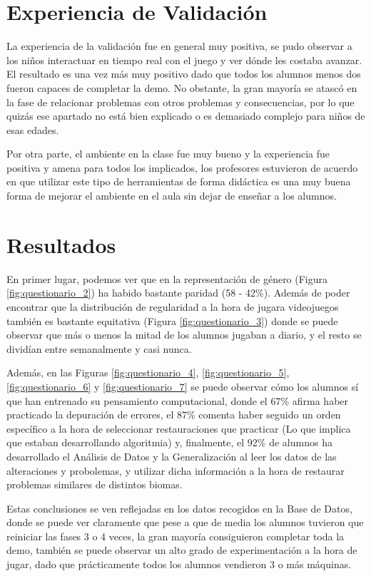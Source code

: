 \section{Experiencia de Validación}

La experiencia de la validación fue en general muy positiva, se pudo observar a los niños interactuar en tiempo real con el juego y ver dónde les costaba avanzar. El resultado es una vez más muy positivo dado que todos los alumnos menos dos fueron capaces de completar la demo. No obstante, la gran mayoría se atascó en la fase de relacionar problemas con otros problemas y consecuencias, por lo que quizás ese apartado no está bien explicado o es demasiado complejo para niños de esas edades.

Por otra parte, el ambiente en la clase fue muy bueno y la experiencia fue positiva y amena para todos los implicados, los profesores estuvieron de acuerdo en que utilizar este tipo de herramientas de forma didáctica es una muy buena forma de mejorar el ambiente en el aula sin dejar de enseñar a los alumnos.

\section{Resultados}

En primer lugar, podemos ver que en la representación de género (Figura \ref{fig:questionario_2}) ha habido bastante paridad (58 - 42\%). Además de poder encontrar que la distribución de regularidad a la hora de jugara videojuegos también es bastante equitativa (Figura \ref{fig:questionario_3}) donde se puede observar que más o menos la mitad de los alumnos jugaban a diario, y el resto se dividían entre semanalmente y casi nunca.

Además, en las Figuras \ref{fig:questionario_4}, \ref{fig:questionario_5}, \ref{fig:questionario_6} y \ref{fig:questionario_7} se puede observar cómo los alumnos sí que han entrenado su pensamiento computacional, donde el 67\% afirma haber practicado la depuración de errores, el 87\% comenta haber seguido un orden específico a la hora de seleccionar restauraciones que practicar (Lo que implica que estaban desarrollando algoritmia) y, finalmente, el 92\% de alumnos ha desarrollado el Análisis de Datos y la Generalización al leer los datos de las alteraciones y probolemas, y utilizar dicha información a la hora de restaurar problemas similares de distintos biomas.

Estas conclusiones se ven reflejadas en los datos recogidos en la Base de Datos, donde se puede ver claramente que pese a que de media los alumnos tuvieron que reiniciar las fases 3 o 4 veces, la gran mayoría consiguieron completar toda la demo, también se puede observar un alto grado de experimentación a la hora de jugar, dado que prácticamente todos los alumnos vendieron 3 o más máquinas. 

